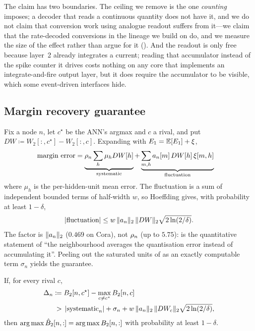The claim has two boundaries. The ceiling we remove is the one \emph{counting} imposes; a decoder
that reads a continuous quantity does not have it, and we do not claim that conversion work using
analogue readout suffers from it---we claim that the rate-decoded conversions in the lineage we
build on do, and we measure the size of the effect rather than argue for it
(). And the readout is only free because layer~2 already integrates a current;
reading that accumulator instead of the spike counter it drives costs nothing on any core that
implements an integrate-and-fire output layer, but it does require the accumulator to be visible,
which some event-driven interfaces hide.

\subsection{Margin recovery guarantee}
\label{sec:thm}

Fix a node $n$, let $c^{\star}$ be the ANN's argmax and $c$ a rival, and put
$DW \coloneqq W_{2}[:,c^{\star}] - W_{2}[:,c]$. Expanding  with
$E_{1} = \mathbb{E}[E_{1}] + \xi$,
\begin{align}
\text{margin error}
&= \underbrace{\rho_{n} \sum_{h} \mu_{h} DW[h]}_{\text{systematic}}
+ \underbrace{\sum_{m,h} a_{n}[m]\, DW[h]\, \xi[m,h]}_{\text{fluctuation}}
\label{eq:split}
\end{align}
where $\mu_{h}$ is the per-hidden-unit mean error. The fluctuation is a sum of independent bounded
terms of half-width $w$, so Hoeffding \citep{hoeffding1963probability} gives, with probability at
least $1-\delta$,
\begin{equation}
\left|\text{fluctuation}\right| \le w\,\lVert a_{n}\rVert_{2}\,\lVert DW\rVert_{2}\sqrt{2\ln(2/\delta)} .
\label{eq:hoeffding}
\end{equation}
The factor is $\lVert a_{n}\rVert_{2}$ ($0.469$ on Cora), not $\rho_{n}$ (up to $5.75$):  is the
quantitative statement of ``the neighbourhood averages the quantisation error instead of accumulating
it''. Peeling out the saturated units of  as an exactly computable term
$\sigma_{n}$ yields the guarantee.

\begin{theorem}
\label{thm:margin}
If, for every rival $c$,
\begin{equation}
\begin{split}
\Delta_{n} \coloneqq {}&B_{2}[n,c^{\star}] - \max_{c \neq c^{\star}} B_{2}[n,c]\\
>{}& \left|\text{systematic}_{n}\right| + \sigma_{n}
+ w\,\lVert a_{n}\rVert_{2}\,\lVert DW_{c}\rVert_{2}\sqrt{2\ln(2/\delta)},
\end{split}
\end{equation}
then $\arg\max \hat{B}_{2}[n,:] = \arg\max B_{2}[n,:]$ with probability at least $1-\delta$.
\end{theorem}

